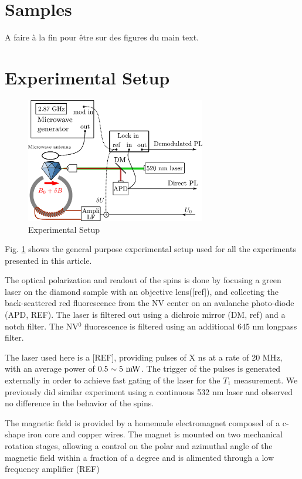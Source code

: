 \documentclass[preprintnumbers,amsmath,amssymb,onecolumn,12pt]{revtex4-2}\usepackage{graphicx}%
\begin{document}
\section{Samples}
A faire à la fin pour être sur des figures du main text.
\section{Experimental Setup}
\begin{figure}
\includegraphics[width=0.7\textwidth]{Figures_SI/shema_exp}
\caption{Experimental Setup}
\label{setup}
\end{figure}
Fig. \ref{setup} shows the general purpose experimental setup used for all the experiments presented in this article.

The optical polarization and readout of the spins is done by focusing a green laser on the diamond sample with an objective lens([ref]), and collecting the back-scattered red fluorescence from the NV center on an avalanche photo-diode (APD, REF). The laser is filtered out using a dichroic mirror (DM, ref) and a notch filter. The NV$^0$ fluorescence is filtered using an additional 645 nm longpass filter.

The laser used here is a [REF], providing pulses of X ns at a rate of 20 MHz, with an average power of $0.5 \sim 5\ \rm mW$. The trigger of the pulses is generated externally in order to achieve fast  gating of the laser for the $T_1$ measurement. We previously did similar experiment using a continuous 532 nm laser and observed no difference in the behavior of the spins.

The magnetic field is provided by a homemade electromagnet composed of a c-shape iron core and  copper wires. The magnet is mounted on two mechanical rotation stages, allowing a control on the polar and azimuthal angle of the magnetic field within a fraction of a degree and is alimented through a low frequency amplifier (REF)
\end{document}
